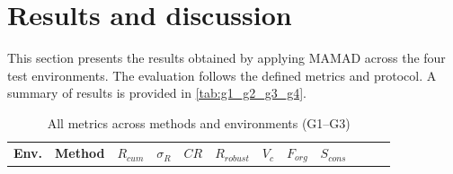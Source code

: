 \documentclass[pdflatex,sn-mathphys-num]{sn-jnl}%
\theoremstyle{thmstyleone}%
\theoremstyle{thmstyletwo}%
\theoremstyle{thmstylethree}%
\begin{document}
\section{Results and discussion} \label{sec:results}

This section presents the results obtained by applying MAMAD across the four test environments. The evaluation follows the defined metrics and protocol. A summary of results is provided in \autoref{tab:g1_g2_g3_g4}.

\medskip

\begin{table}[h!]
    \centering
    \caption{All metrics across methods and environments (G1--G3)}
    \footnotesize
    \begin{tabular}{p{0.5cm}|p{1cm}|p{0.4cm}p{0.3cm}p{0.3cm}p{0.85cm}|p{0.4cm}p{0.4cm}p{0.55cm}|p{0.8cm}p{0.8cm}p{0.8cm}}
        \hline
        \textbf{Env.} & \textbf{Method}

        
        
        
        
        
        
        
        
        
        
        
        
                      & $R_{cum}$       & $\sigma_R$   & $CR$       & $R_{robust}$

        
        
        
        
        
        
        
        
        
        
        
        
                      & $V_c$           & $F_{org}$    & $S_{cons}$

        
        
        
        
        
        
        
        
        
        
        
        

\end{tabular}
\end{table}
\end{document}
